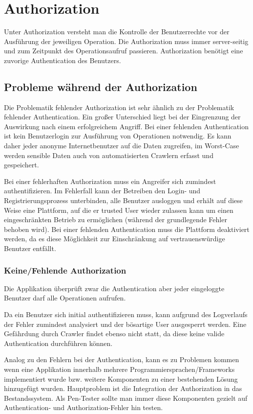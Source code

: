 \chapter{Authorization}

Unter Authorization versteht man die Kontrolle der Benutzerrechte vor der Ausführung der jeweiligen Operation. Die Authorization muss immer server-seitig und zum Zeitpunkt des Operationsaufruf passieren. Authorization benötigt eine zuvorige Authentication des Benutzers.

\section{Probleme während der Authorization}

Die Problematik fehlender Authorization ist sehr ähnlich zu der Problematik fehlender Authentication. Ein großer Unterschied liegt bei der Eingrenzung der Auswirkung nach einem erfolgreichem Angriff. Bei einer fehlenden Authentication ist kein Benutzerlogin zur Ausführung von Operationen notwendig. Es kann daher jeder anonyme Internetbenutzer auf die Daten zugreifen, im Worst-Case werden sensible Daten auch von automatisierten Crawlern erfasst und gespeichert.

Bei einer fehlerhaften Authorization muss ein Angreifer sich zumindest authentifizieren. Im Fehlerfall kann der Betreiben den Login- und Registrierungsprozess unterbinden, alle Benutzer ausloggen und erhält auf diese Weise eine Plattform, auf die er trusted User wieder zulassen kann um einen eingeschränkten Betrieb zu ermöglichen (während der grundlegende Fehler behoben wird). Bei einer fehlenden Authentication muss die Plattform deaktiviert werden, da es diese Möglichkeit zur Einschränkung auf vertrauenswürdige Benutzer entfällt.

\subsection{Keine/Fehlende Authorization}

Die Applikation überprüft zwar die Authentication aber jeder eingeloggte Benutzer darf alle Operationen aufrufen.

Da ein Benutzer sich initial authentifizieren muss, kann aufgrund des Logverlaufs der Fehler zumindest analysiert und der bösartige User ausgesperrt werden. Eine Gefährdung durch Crawler findet ebenso nicht statt, da diese keine valide Authentication durchführen können.

Analog zu den Fehlern bei der Authentication, kann es zu Problemen kommen wenn eine Applikation innerhalb mehrere Programmiersprachen/Frameworks implementiert wurde bzw. weitere Komponenten zu einer bestehenden Lösung hinzugefügt wurden. Hauptproblem ist die Integration der Authorization in das Bestandssystem. Als Pen-Tester sollte man immer diese Komponenten gezielt auf Authentication- und Authorization-Fehler hin testen.

